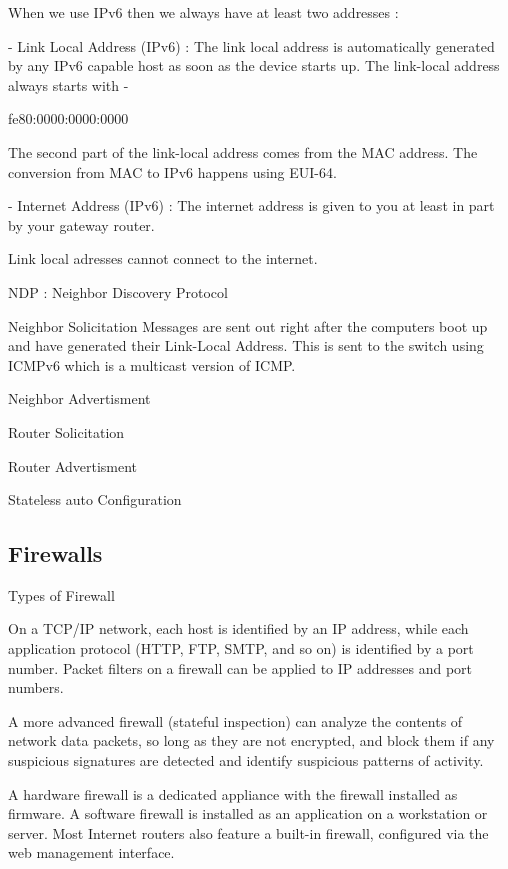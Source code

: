 When we use IPv6 then we always have at least two addresses :

 - Link Local Address (IPv6) : The link local address is automatically generated
 by any IPv6 capable host as soon as the device starts up. The link-local
 address always starts with - 

 fe80:0000:0000:0000

 The second part of the link-local address comes from the MAC address. The
 conversion from MAC to IPv6 happens using EUI-64.

 - Internet Address (IPv6) : The internet address is given to you at least in
 part by your gateway router.

 Link local adresses cannot connect to the internet.





NDP : Neighbor Discovery Protocol

Neighbor Solicitation Messages are sent out right after the computers boot up
and have generated their Link-Local Address. This is sent to the switch using
ICMPv6 which is a multicast version of ICMP.

Neighbor Advertisment

Router Solicitation

Router Advertisment

Stateless auto Configuration

\subsectionend


\subsection{Firewalls}
\label{ssec:firewalls}


Types of Firewall

On a TCP/IP network, each host is identified by an IP address, while each
application protocol (HTTP, FTP, SMTP, and so on) is identified by a port
number. Packet filters on a firewall can be applied to IP addresses and port
numbers.

A more advanced firewall (stateful inspection) can analyze the contents of
network data packets, so long as they are not encrypted, and block them if any
suspicious signatures are detected and identify suspicious patterns of activity.

A hardware firewall is a dedicated appliance with the firewall installed as
firmware. A software firewall is installed as an application on a workstation or
server. Most Internet routers also feature a built-in firewall, configured via
the web management interface. 

